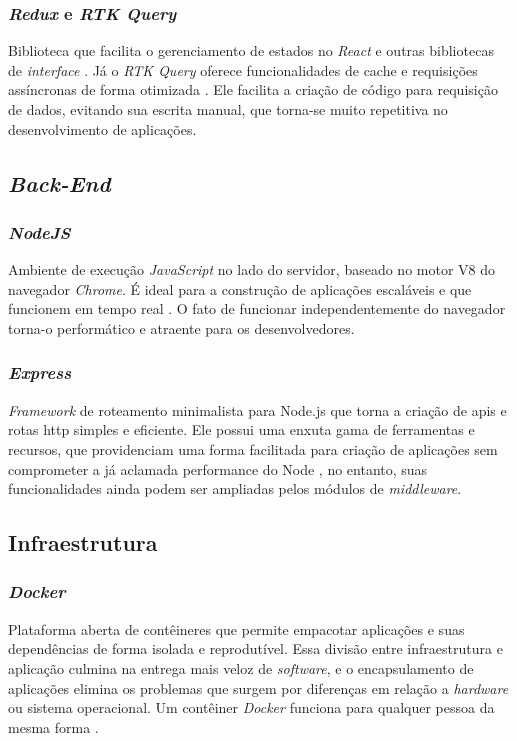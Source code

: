 \subsubsection{\emph{Redux} e \emph{RTK Query}} 
Biblioteca que facilita o gerenciamento de estados no \emph{React} e outras bibliotecas de \emph{interface }\cite{redux}. Já o \emph{RTK Query} oferece funcionalidades de cache e requisições assíncronas de forma otimizada \cite{rtk-query}. Ele facilita a criação de código para requisição de dados, evitando sua escrita manual, que torna-se muito repetitiva no desenvolvimento de aplicações. 

\subsection{\emph{Back-End}} 

\subsubsection{\emph{NodeJS}} 
Ambiente de execução \emph{JavaScript} no lado do servidor, baseado no motor V8 do navegador \emph{Chrome}. É ideal para a construção de aplicações escaláveis e que funcionem em tempo real \cite{node}. O fato de funcionar independentemente do navegador torna-o performático e atraente para os desenvolvedores.

\subsubsection{\emph{Express}} 
\emph{Framework} de roteamento minimalista para Node.js que torna a criação de \gls{api}s e rotas \gls{http} simples e eficiente. Ele possui uma enxuta gama de ferramentas e recursos, que providenciam uma forma facilitada para criação de aplicações sem comprometer a já aclamada performance do Node \cite{express}, no entanto, suas funcionalidades ainda podem ser ampliadas pelos módulos de \emph{middleware}.

\subsection{Infraestrutura} 

\subsubsection{\emph{Docker}}
Plataforma aberta de contêineres que permite empacotar aplicações e suas dependências de forma isolada e reprodutível. Essa divisão entre infraestrutura e aplicação culmina na entrega mais veloz de \emph{software}, e o encapsulamento de aplicações elimina os problemas que surgem por diferenças em relação a \emph{hardware} ou sistema operacional. Um contêiner \emph{Docker} funciona para qualquer pessoa da mesma forma \cite{docker}.

